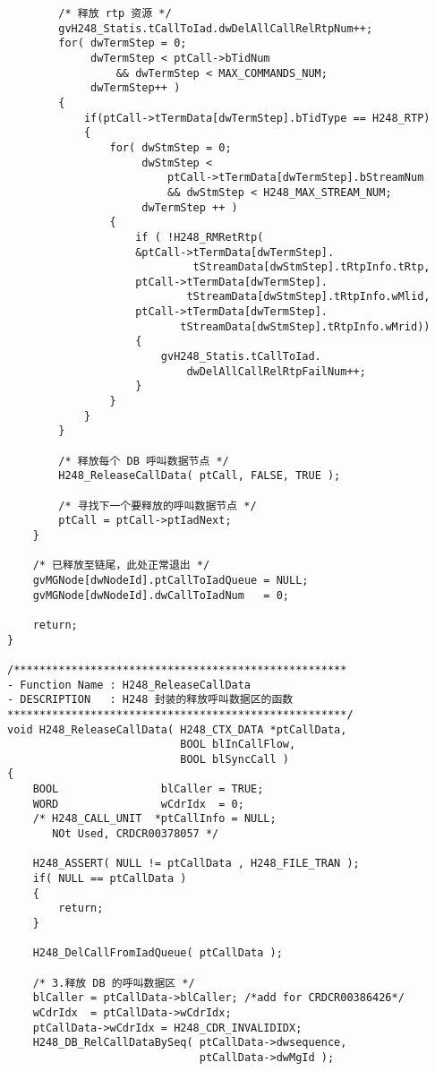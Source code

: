 ﻿\documentclass  [11pt,onecolumn]{article}
\begin{document}
\begin{lstlisting}
        /* 释放 rtp 资源 */
        gvH248_Statis.tCallToIad.dwDelAllCallRelRtpNum++;
        for( dwTermStep = 0;
             dwTermStep < ptCall->bTidNum
                 && dwTermStep < MAX_COMMANDS_NUM;
             dwTermStep++ )
        {
            if(ptCall->tTermData[dwTermStep].bTidType == H248_RTP)
            {
                for( dwStmStep = 0; 
                     dwStmStep <
                         ptCall->tTermData[dwTermStep].bStreamNum
                         && dwStmStep < H248_MAX_STREAM_NUM; 
                     dwTermStep ++ )
                {
                    if ( !H248_RMRetRtp(
                    &ptCall->tTermData[dwTermStep].
                             tStreamData[dwStmStep].tRtpInfo.tRtp, 
                    ptCall->tTermData[dwTermStep].
                            tStreamData[dwStmStep].tRtpInfo.wMlid, 
                    ptCall->tTermData[dwTermStep].
                           tStreamData[dwStmStep].tRtpInfo.wMrid))
                    {
                        gvH248_Statis.tCallToIad.
                            dwDelAllCallRelRtpFailNum++;
                    }
                }
            }
        }
        
        /* 释放每个 DB 呼叫数据节点 */
        H248_ReleaseCallData( ptCall, FALSE, TRUE ); 
        
        /* 寻找下一个要释放的呼叫数据节点 */
        ptCall = ptCall->ptIadNext;
    }
    
    /* 已释放至链尾，此处正常退出 */
    gvMGNode[dwNodeId].ptCallToIadQueue = NULL;
    gvMGNode[dwNodeId].dwCallToIadNum   = 0;

    return;
}

/****************************************************
- Function Name : H248_ReleaseCallData
- DESCRIPTION   : H248 封装的释放呼叫数据区的函数
*****************************************************/
void H248_ReleaseCallData( H248_CTX_DATA *ptCallData,
                           BOOL blInCallFlow,
                           BOOL blSyncCall )
{
    BOOL                blCaller = TRUE;
    WORD                wCdrIdx  = 0;
    /* H248_CALL_UNIT  *ptCallInfo = NULL;
       NOt Used, CRDCR00378057 */            

    H248_ASSERT( NULL != ptCallData , H248_FILE_TRAN );
    if( NULL == ptCallData )
    {
        return;
    }

    H248_DelCallFromIadQueue( ptCallData );
    
    /* 3.释放 DB 的呼叫数据区 */
    blCaller = ptCallData->blCaller; /*add for CRDCR00386426*/
    wCdrIdx  = ptCallData->wCdrIdx;
    ptCallData->wCdrIdx = H248_CDR_INVALIDIDX;
    H248_DB_RelCallDataBySeq( ptCallData->dwsequence,
                              ptCallData->dwMgId );


\end{lstlisting}
\end{document}
